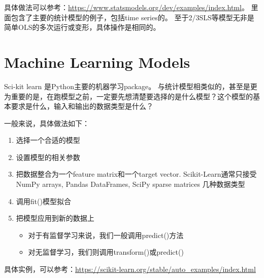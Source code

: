 \documentclass[11pt,fleqn]{book} %
\begin{document}
具体做法可以参考：\url{https://www.statsmodels.org/dev/examples/index.html}。 里面包含了主要的统计模型的例子，包括time series的。
至于2/3SLS等模型无非是简单OLS的多次运行或变形，具体操作是相同的。


\section{Machine Learning Models}
Sci-kit learn 是Python主要的机器学习package。
与统计模型相类似的，甚至是更为重要的是，在跑模型之前，一定要先想清楚要选择的是什么模型？这个模型的基本要求是什么，输入和输出的数据类型是什么？

一般来说，具体做法如下：
\begin{enumerate}
\item 选择一个合适的模型
\item 设置模型的相关参数
\item 把数据整合为一个feature matrix和一个target vector. Scikit-Learn通常只接受 NumPy arrays, Pandas DataFrames, SciPy sparse matrices 几种数据类型
\item 调用fit()模型拟合
\item 把模型应用到新的数据上
\begin{itemize}
\item 对于有监督学习来说，我们一般调用predict()方法
\item 对无监督学习，我们则调用transform()或predict()
\end{itemize}

\end{enumerate}

具体实例，可以参考：\url{https://scikit-learn.org/stable/auto_examples/index.html}


%
\end{document}
